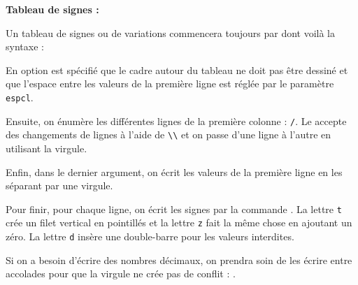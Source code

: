 \documentclass[10pt,french,openright,twoside]{book}
\begin{document}
{\NewFont
\begin{CenterExample}
    \textbf{Tableau de signes :}\par
\end{CenterExample}
}\bigskip

Un tableau de signes ou de variations commencera toujours par  dont voilà la syntaxe :
\begin{center}
\end{center}

 En option est spécifié que le cadre autour du tableau ne doit pas être dessiné et que l'espace entre les valeurs de la première ligne est réglée par le paramètre \verb!espcl!.

 Ensuite, on énumère les différentes lignes de la première colonne : \verb!/!. Le  accepte des changements de lignes à l'aide de \verb!\\! et on passe d'une ligne à l'autre en utilisant la virgule.

 Enfin, dans le dernier argument, on écrit les valeurs de la première ligne en les séparant par une virgule.\medskip

 Pour finir, pour chaque ligne, on écrit les signes par la commande . La lettre \verb!t! crée un filet vertical en pointillés et la lettre \verb!z! fait la même chose en ajoutant un zéro. La lettre \verb!d! insère une double-barre pour les valeurs interdites.

 \begin{info}
    Si on a besoin d'écrire des nombres décimaux, on prendra soin de les écrire entre accolades pour que la virgule ne crée pas de conflit : .
 \end{info}
\end{document}
